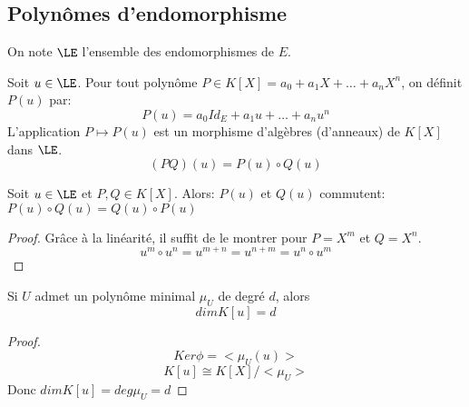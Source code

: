 \subsection{Polynômes d'endomorphisme}
On note $\LE$ l'ensemble des endomorphismes de $E$.

\begin{definition}
	Soit $u \in \LE$. Pour tout polynôme $P \in K[X] = a_0 + a_1X + \ldots + a_nX^n$, on définit $P(u)$ par:
	$$P(u) = a_0 Id_E + a_1 u + \ldots + a_n u^n$$
	L'application $P \mapsto P(u)$ est un morphisme d'algèbres (d'anneaux) de $K[X]$ dans $\LE$.
	$$(PQ)(u) = P(u)\circ Q(u)$$
\end{definition}

\begin{prop}
	Soit $u \in \LE$ et $P, Q \in K[X]$. Alors:
	$P(u)$ et $Q(u)$ commutent: $P(u)\circ Q(u) = Q(u)\circ P(u)$
\end{prop}

\begin{proof}
	Grâce à la linéarité, il suffit de le montrer pour $P = X^m$ et $Q = X^n$.
	$$u^m\circ u^n = u^{m+n} = u^{n+m} = u^n\circ u^m$$
\end{proof}

\begin{remarque}
	Si $U$ admet un polynôme minimal $\mu_U$ de degré $d$, alors
	$$ dim K[u] = d $$
\end{remarque}



\begin{proof}
	$$Ker \phi = <\mu_U(u)>$$
	$$ K[u] \cong K[X] / <\mu_U>$$
	Donc $dim K[u] = deg \mu_U = d$
\end{proof}

